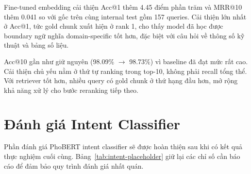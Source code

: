 \documentclass[../DoAn.tex]{subfiles}
\begin{document}
\begin{table}[H]
    \centering
    \caption{So sánh embedding fine-tuned với baseline}
    \label{tab:embedding-baseline}
    {\small
    \setlength{\tabcolsep}{5pt}
    }
\end{table}

Fine-tuned embedding cải thiện Acc@1 thêm 4.45 điểm phần trăm và MRR@10 thêm 0.041 so với  gốc trên cùng internal test gồm 157 queries. Cải thiện lớn nhất ở Acc@1, tức gold chunk xuất hiện ở rank 1, cho thấy model đã học được boundary ngữ nghĩa domain-specific tốt hơn, đặc biệt với câu hỏi về thông số kỹ thuật và bảng số liệu.

Acc@10 gần như giữ nguyên (98.09\% $\rightarrow$ 98.73\%) vì baseline đã đạt mức rất cao. Cải thiện chủ yếu nằm ở thứ tự ranking trong top-10, không phải recall tổng thể. Với retriever tốt hơn, nhiều query có gold chunk ở thứ hạng đầu hơn, mở rộng khả năng xử lý cho bước reranking tiếp theo.

\section{Đánh giá Intent Classifier}
\label{section:5.4}

Phần đánh giá PhoBERT intent classifier sẽ được hoàn thiện sau khi có kết quả thực nghiệm cuối cùng. Bảng~\ref{tab:intent-placeholder} giữ lại các chỉ số cần báo cáo để đảm bảo quy trình đánh giá nhất quán.
\end{document}

